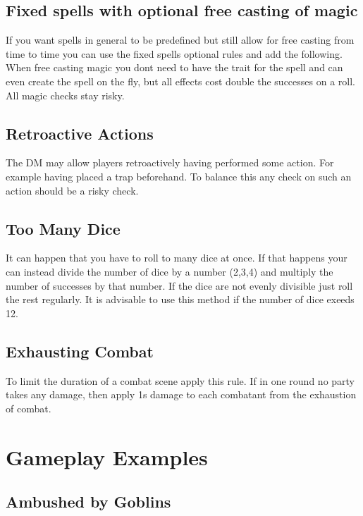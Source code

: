 \documentclass[11pt]{article}
\begin{document}
{\begin{multicols}{2}[]
\subsection{Fixed spells with optional free casting of magic}
\label{sec:orga6d35b2}
If you want spells in general to be predefined but still allow for free casting from time to time you can use the fixed spells optional rules and add the following. When free casting magic you dont need to have the trait for the spell and can even create the spell on the fly, but all effects cost double the successes on a roll. All magic checks stay risky.

\subsection{Retroactive Actions}
\label{sec:org8b2d805}
The DM may allow players retroactively having performed some action. For example having placed a trap beforehand. To balance this any check on such an action should be a risky check.

\subsection{Too Many Dice}
\label{sec:org51749e0}
It can happen that you have to roll to many dice at once. If that happens your can instead divide the number of dice by a number (2,3,4) and multiply the number of successes by that number. If the dice are not evenly divisible just roll the rest regularly. It is advisable to use this method if the number of dice exeeds 12.

\subsection{Exhausting Combat}
\label{sec:orgc145817}
To limit the duration of a combat scene apply this rule. If in one round no party takes any damage, then apply 1s damage to each combatant from the exhaustion of combat. 

\newpage
\section{Gameplay Examples}
\label{sec:org6d5b968}

\subsection{Ambushed by Goblins}
\label{sec:org515e88d}


\end{multicols}}
\end{document}
